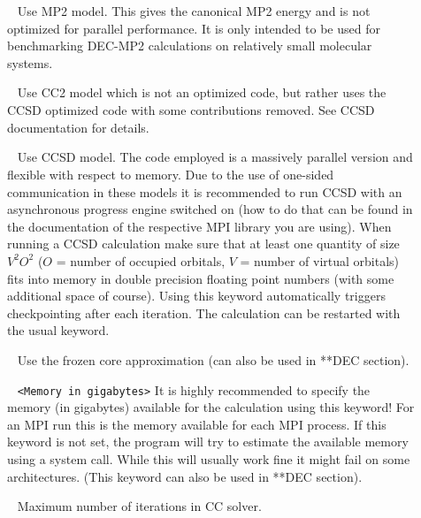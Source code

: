 \begin{description}

\item[]\verb| | \newline
Use MP2 model. This gives the canonical MP2 energy and is not optimized for parallel performance. It is only intended to be used for benchmarking DEC-MP2 calculations on relatively small molecular systems.

\item[]\verb| | \newline
Use CC2 model which is not an optimized code, but rather uses the CCSD optimized code with some contributions removed. See CCSD documentation for details.

\item[]\verb| | \newline
Use CCSD model. The code employed is a massively parallel version and flexible with respect to memory. Due to the use of one-sided communication in these models it is recommended to run CCSD with an asynchronous progress engine switched on (how to do that can be found in the documentation of the respective MPI library you are using). When running a CCSD calculation make sure that at least one quantity of size $V^2O^2$ ($O$ = number of occupied orbitals, $V$ = number of virtual orbitals) fits into memory in double precision floating point numbers (with some additional space of course). Using this keyword automatically triggers checkpointing after each iteration. The calculation can be restarted with the usual  keyword.

\item[]  \verb| | \newline
Use the frozen core approximation (can also be used in **DEC section).

\item[] \verb| | \newline
\verb|<Memory in gigabytes>| \newline
It is highly recommended to specify the memory (in gigabytes) available for the calculation using this keyword! For an MPI run this is the memory available for each MPI process.
If this keyword is not set, the program will try to estimate the available memory using a system call. While this will usually work fine it might fail on some architectures.
(This keyword can also be used in **DEC section).

\item[]  \verb| | \newline
Maximum number of iterations in CC solver.


\end{description}
